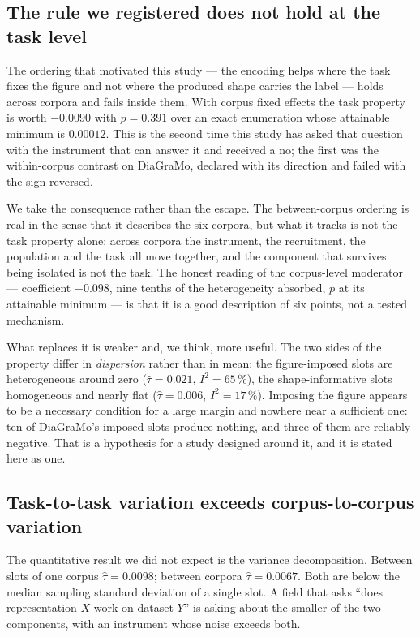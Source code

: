 \subsection{The rule we registered does not hold at the task level}
\label{sec:discussion-rule}

The ordering that motivated this study --- the encoding helps where the task fixes the figure and
not where the produced shape carries the label --- holds across corpora and fails inside them. With
corpus fixed effects the task property is worth $-0.0090$ with $p = 0.391$ over an exact enumeration
whose attainable minimum is $0.00012$. This is the second time this study has asked that question
with the instrument that can answer it and received a no; the first was the within-corpus contrast on
DiaGraMo, declared with its direction and failed with the sign reversed.

We take the consequence rather than the escape. The between-corpus ordering is real in the sense
that it describes the six corpora, but what it tracks is not the task property alone: across corpora
the instrument, the recruitment, the population and the task all move together, and the component
that survives being isolated is not the task. The honest reading of the corpus-level moderator ---
coefficient $+0.098$, nine tenths of the heterogeneity absorbed, $p$ at its attainable minimum --- is
that it is a good description of six points, not a tested mechanism.

What replaces it is weaker and, we think, more useful. The two sides of the property differ in
\emph{dispersion} rather than in mean: the figure-imposed slots are heterogeneous around zero
($\hat\tau = 0.021$, $I^2 = 65\,\%$), the shape-informative slots homogeneous and nearly flat
($\hat\tau = 0.006$, $I^2 = 17\,\%$). Imposing the figure appears to be a necessary condition for a
large margin and nowhere near a sufficient one: ten of DiaGraMo's imposed slots produce nothing, and
three of them are reliably negative. That is a hypothesis for a study designed around it, and it is
stated here as one.

\subsection{Task-to-task variation exceeds corpus-to-corpus variation}
\label{sec:discussion-unit}

The quantitative result we did not expect is the variance decomposition. Between slots of one corpus
$\hat\tau = 0.0098$; between corpora $\hat\tau = 0.0067$. Both are below the median sampling
standard deviation of a single slot. A field that asks ``does representation $X$ work on dataset
$Y$'' is asking about the smaller of the two components, with an instrument whose noise exceeds
both.


